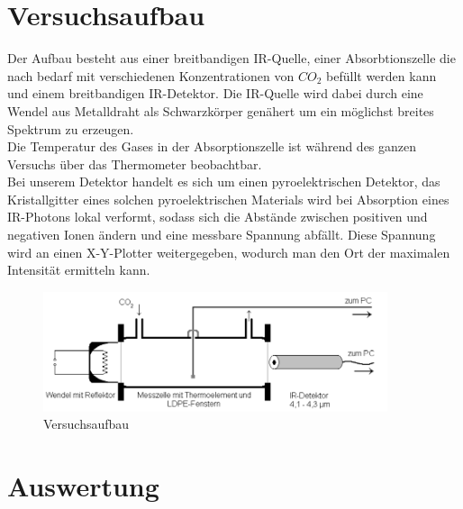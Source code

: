 \documentclass{article}
\begin{document}
    \section{Versuchsaufbau}
        Der Aufbau besteht aus einer breitbandigen IR-Quelle, einer Absorbtionszelle die nach bedarf mit verschiedenen
        Konzentrationen von $CO_2$ befüllt werden kann und einem breitbandigen IR-Detektor.
        Die IR-Quelle wird dabei durch eine Wendel aus Metalldraht als Schwarzkörper genähert um ein möglichst breites
        Spektrum zu erzeugen.\\
        Die Temperatur des Gases in der Absorptionszelle ist während des ganzen Versuchs über das Thermometer beobachtbar.\\
        Bei unserem Detektor handelt es sich um einen pyroelektrischen Detektor, das Kristallgitter eines solchen
        pyroelektrischen Materials wird bei Absorption eines IR-Photons lokal verformt, sodass sich die Abstände
        zwischen positiven und negativen Ionen ändern und eine messbare Spannung abfällt.
        Diese Spannung wird an einen X-Y-Plotter weitergegeben, wodurch man den Ort der maximalen Intensität ermitteln kann.
        \begin{figure}[H]
            \centering
            \includegraphics[width=0.9\textwidth]{Images/Versuchsaufbau.PNG}
            \caption{Versuchsaufbau}
        \end{figure}

    \section{Auswertung}
\end{document}
